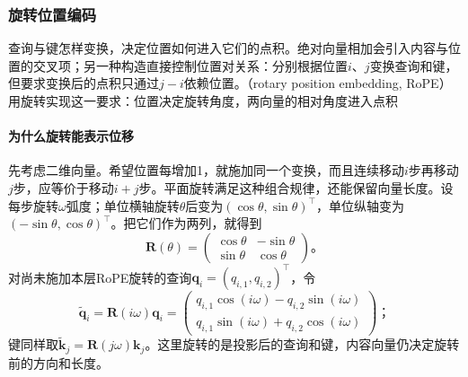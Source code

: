 \subsubsection{旋转位置编码}

查询与键怎样变换，决定位置如何进入它们的点积。绝对向量相加会引入内容与位置的交叉项；另一种构造直接控制位置对关系：分别根据位置$i$、$j$变换查询和键，但要求变换后的点积只通过$j-i$依赖位置。（rotary position embedding, RoPE）用旋转实现这一要求：位置决定旋转角度，两向量的相对角度进入点积

\paragraph{为什么旋转能表示位移}
先考虑二维向量。希望位置每增加1，就施加同一个变换，而且连续移动$i$步再移动$j$步，应等价于移动$i+j$步。平面旋转满足这种组合规律，还能保留向量长度。设每步旋转$\omega$弧度；单位横轴旋转$\theta$后变为$(\cos\theta,\sin\theta)^{\top}$，单位纵轴变为$(-\sin\theta,\cos\theta)^{\top}$。把它们作为两列，就得到
\begin{equation}
  \bm R(\theta)=
  \begin{pmatrix}
    \cos\theta&-\sin\theta\\
    \sin\theta&\cos\theta
  \end{pmatrix}\text{。}
  \label{eq:transformer-rope-rotation}
\end{equation}
对尚未施加本层RoPE旋转的查询$\bm q_i=(q_{i,1},q_{i,2})^{\top}$，令
\[
  \widetilde{\bm q}_i=\bm R(i\omega)\bm q_i
  =\begin{pmatrix}
     q_{i,1}\cos(i\omega)-q_{i,2}\sin(i\omega)\\
     q_{i,1}\sin(i\omega)+q_{i,2}\cos(i\omega)
   \end{pmatrix}\text{；}
\]
键同样取$\widetilde{\bm k}_j=\bm R(j\omega)\bm k_j$。这里旋转的是投影后的查询和键，内容向量仍决定旋转前的方向和长度。

